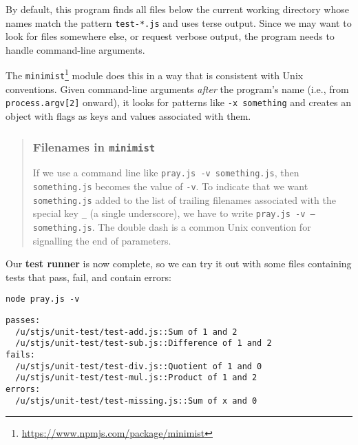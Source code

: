 \documentclass[krantzl]{krantz}
\newcommand{\glossref}[1]{\textbf{#1}}
\newenvironment{callout}{\savenotes\begin{tBox}\begin{quotation}\toggletrue{inbox}\renewcommand{\thempfootnote}{\arabic{footnote}}}{\end{quotation}\vspace{\baselineskip}\end{tBox}\togglefalse{inbox}\spewnotes}
\newcommand{\hreffoot}[2]{{#1}\footnote{\href{#2}{#2}}}
\begin{document}
By default,
this program finds all files below the current working directory
whose names match the pattern \texttt{test-*.js}
and uses terse output.
Since we may want to look for files somewhere else,
or request verbose output,
the program needs to handle command-line arguments.


The \hreffoot{\texttt{minimist}}{https://www.npmjs.com/package/minimist} module does this
in a way that is consistent with Unix conventions.
Given command-line arguments \emph{after} the program's name
(i.e., from \texttt{process.argv[2]} onward),
it looks for patterns like \texttt{-x something}
and creates an object with flags as keys and values associated with them.

\begin{callout}


\subsubsection*{Filenames in \texttt{minimist}}


If we use a command line like \texttt{pray.js -v something.js},
then \texttt{something.js} becomes the value of \texttt{-v}.
To indicate that we want \texttt{something.js} added to the list of trailing filenames
associated with the special key \texttt{\_} (a single underscore),
we have to write \texttt{pray.js -v -- something.js}.
The double dash is a common Unix convention for signalling the end of parameters.

\end{callout}


Our \glossref{test runner} is now complete,
so we can try it out with some files containing tests that pass, fail, and contain errors:


\begin{lstlisting}[frame=single,frameround=tttt]
node pray.js -v
\end{lstlisting}



\begin{lstlisting}[frame=single,frameround=tttt]
passes:
  /u/stjs/unit-test/test-add.js::Sum of 1 and 2
  /u/stjs/unit-test/test-sub.js::Difference of 1 and 2
fails:
  /u/stjs/unit-test/test-div.js::Quotient of 1 and 0
  /u/stjs/unit-test/test-mul.js::Product of 1 and 2
errors:
  /u/stjs/unit-test/test-missing.js::Sum of x and 0
\end{lstlisting}
\end{document}
